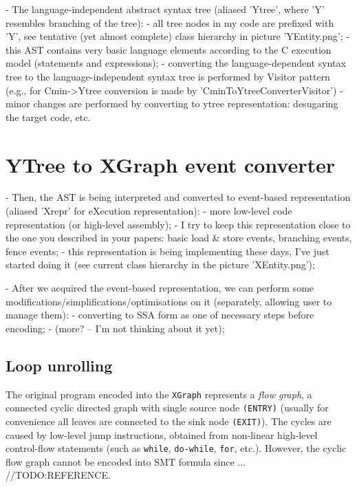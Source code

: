 - The language-independent abstract syntax tree (aliased 'Ytree', where 'Y' resembles branching of the tree):
        - all tree nodes in my code are prefixed with 'Y', see tentative (yet almost complete) class hierarchy in picture 'YEntity.png';
        - this AST contains very basic language elements according to the C execution model (statements and expressions);
        - converting the language-dependent syntax tree to the language-independent syntax tree is performed by Visitor pattern (e.g., for Cmin->Ytree conversion is made by 'CminToYtreeConverterVisitor')
        - minor changes are performed by converting to ytree representation: desugaring the target code, etc.


\section{YTree to XGraph event converter}
\label{ch:impl:x2y}

- Then, the AST is being interpreted and converted to event-based representation (aliased 'Xrepr' for eXecution representation):
        - more low-level code representation (or high-level assembly);
        - I try to keep this representation close to the one you described in your papers: basic load \& store events, branching events, fence events;
        - this representation is being implementing these days, I've just started doing it (see current class hierarchy in the picture 'XEntity.png');
        
- After we acquired the event-based representation, we can perform some modifications/simplifications/optimisations on it (separately, allowing user to manage them):
        - converting to SSA form as one of necessary steps before encoding;
        - (more? -- I'm not thinking about it yet);
        
\subsection{Loop unrolling}
\label{ch:impl:x2y:unrolling}

The original program encoded into the \texttt{XGraph} represents a \textit{flow graph}, a connected cyclic directed graph with single source node \texttt{(ENTRY)} (usually for convenience all leaves are connected to the sink node \texttt{(EXIT)}). The cycles are caused by low-level jump instructions, obtained from non-linear high-level control-flow statements (such as \texttt{while}, \texttt{do-while}, \texttt{for}, etc.). However, the cyclic flow graph cannot be encoded into SMT formula since ...
//TODO:REFERENCE.%



